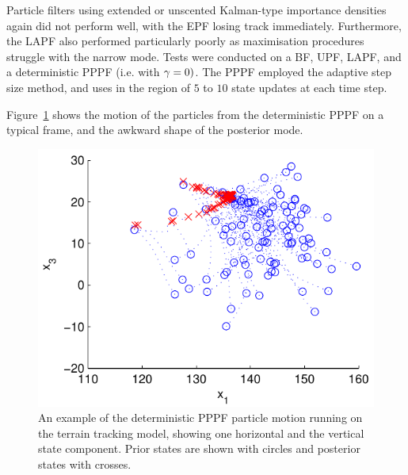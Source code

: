\documentclass{article}
\begin{document}
Particle filters using extended or unscented Kalman-type importance densities again did not perform well, with the EPF losing track immediately. Furthermore, the LAPF also performed particularly poorly as maximisation procedures struggle with the narrow mode. Tests were conducted on a BF, UPF, LAPF, and a deterministic PPPF (i.e. with $\gamma=0)$. The PPPF employed the adaptive step size method, and uses in the region of $5$ to $10$ state updates at each time step.

Figure~\ref{fig:drone_example_frame_deterministic} shows the motion of the particles from the deterministic PPPF on a typical frame, and the awkward shape of the posterior mode.
%
\begin{figure}
\centering
\includegraphics[width=0.7\columnwidth]{drone_example_frame_deter.pdf}
\caption{An example of the deterministic PPPF particle motion running on the terrain tracking model, showing one horizontal and the vertical state component. Prior states are shown with circles and posterior states with crosses.}
\label{fig:drone_example_frame_deterministic}
\end{figure}
\end{document}
